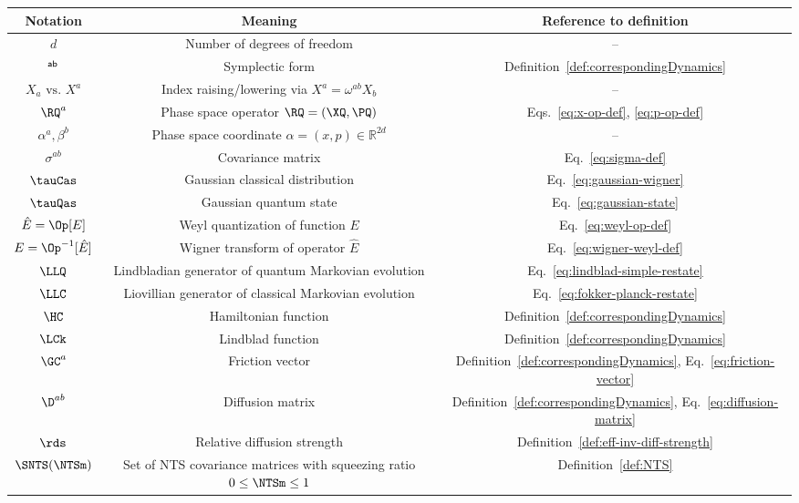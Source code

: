 \documentclass{article}
\numberwithin{equation}{section}
\begin{document}
\begin{table}
     \centering
 \begin{tabular}{c|c|c}
    Notation & Meaning & Reference to definition \\
    \hline
    $d$ & Number of degrees of freedom  & -- \\
    $\sf^{ab}$ & Symplectic form & Definition~\ref{def:correspondingDynamics}  \\
    $X_a \text{ vs. } X^a$ & Index raising/lowering via $X^a = \omega^{ab} X_b$ & -- \\
    $\RQ^a$ & Phase space operator
    $\RQ = (\XQ,\PQ)$  & Eqs.~\eqref{eq:x-op-def}, \eqref{eq:p-op-def} \\
    $\alpha^a, \beta^b$ & Phase space coordinate $\alpha=(x,p) \in \mathbb{R}^{2d}$ & -- \\
    $\sigma^{ab}$ &  Covariance matrix  & Eq.~\eqref{eq:sigma-def} \\
    $\tauCas$ & Gaussian classical distribution   & Eq.~\eqref{eq:gaussian-wigner} \\
    $\tauQas$ & Gaussian quantum state  & Eq.~\eqref{eq:gaussian-state} \\
    $\hat{E} = \Op[E]$ & Weyl quantization of function $E$  & Eq.~\eqref{eq:weyl-op-def}
    \\
    $E = \Op^{-1}[\hat{E}]$ & Wigner transform of operator $\hat{E}$
    &  Eq.~\eqref{eq:wigner-weyl-def} \\
    $\LLQ$ & Lindbladian generator of quantum Markovian evolution &  
     Eq.~\eqref{eq:lindblad-simple-restate}\\
    $\LLC$ & Liovillian generator of classical Markovian evolution &  
    Eq.~\eqref{eq:fokker-planck-restate}\\
    $\HC$ & Hamiltonian function &  
    Definition~\ref{def:correspondingDynamics}\\
    $\LCk$ & Lindblad function & 
    Definition~\ref{def:correspondingDynamics}\\
    $\GC^a$ & Friction vector & Definition~\ref{def:correspondingDynamics},
    Eq.~\eqref{eq:friction-vector}\\
    $\D^{ab}$ & Diffusion matrix &  Definition~\ref{def:correspondingDynamics},
    Eq.~\eqref{eq:diffusion-matrix} \\
    $\rds$ & Relative diffusion strength &
    Definition~\ref{def:eff-inv-diff-strength}
    \\
    $\SNTS(\NTSm)$ & Set of NTS covariance matrices with squeezing ratio $0\le\NTSm\le 1$ & 
    Definition~\ref{def:NTS}\\

\end{tabular}
\end{table}
\end{document}
